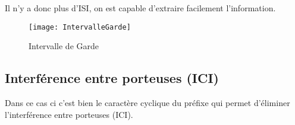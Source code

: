 Il n'y a donc plus d'ISI, on est capable d'extraire facilement l'information.


\begin{figure}[!h]
  \centering
  \texttt{[image: IntervalleGarde]}
  \caption{Intervalle de Garde}
  \label{fig:intervalleGarde}
\end{figure}

\subsection{Interférence entre porteuses (ICI)}


Dans ce cas ci c'est bien le caractère cyclique du préfixe qui permet d'éliminer
l'interférence entre porteuses (ICI).



